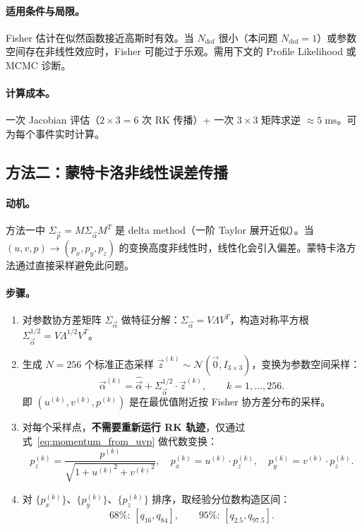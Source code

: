 \documentclass[a4paper, 11pt]{article}
\begin{document}
\paragraph{适用条件与局限。} Fisher 估计在似然函数接近高斯时有效。当 $N_\mathrm{dof}$ 很小（本问题 $N_\mathrm{dof} = 1$）或参数空间存在非线性效应时，Fisher 可能过于乐观。需用下文的 Profile Likelihood 或 MCMC 诊断。

\paragraph{计算成本。} 一次 Jacobian 评估（$2 \times 3 = 6$ 次 RK 传播）+ 一次 $3 \times 3$ 矩阵求逆 $\approx 5\;\mathrm{ms}$。可为每个事件实时计算。

\subsection{方法二：蒙特卡洛非线性误差传播}
\label{sec:mc_prop}

\paragraph{动机。}
方法一中 $\Sigma_{\vec{p}} = M \Sigma_{\vec{\alpha}} M^T$ 是 delta method（一阶 Taylor 展开近似）。当 $(u, v, p) \to (p_x, p_y, p_z)$ 的变换高度非线性时，线性化会引入偏差。蒙特卡洛方法通过直接采样避免此问题。

\paragraph{步骤。}
\begin{enumerate}[nosep]
  \item 对参数协方差矩阵 $\Sigma_{\vec{\alpha}}$ 做特征分解：$\Sigma_{\vec{\alpha}} = V \Lambda V^T$，构造对称平方根 $\Sigma_{\vec{\alpha}}^{1/2} = V \Lambda^{1/2} V^T$。
  \item 生成 $N = 256$ 个标准正态采样 $\vec{z}^{(k)} \sim \mathcal{N}(\vec{0}, I_{3\times3})$，变换为参数空间采样：
  \begin{equation}
    \vec{\alpha}^{(k)} = \hat{\vec{\alpha}} + \Sigma_{\vec{\alpha}}^{1/2} \cdot \vec{z}^{(k)},
    \qquad k = 1, \dots, 256.
  \end{equation}
  即 $(u^{(k)}, v^{(k)}, p^{(k)})$ 是在最优值附近按 Fisher 协方差分布的采样。
  \item 对每个采样点，\textbf{不需要重新运行 RK 轨迹}，仅通过式~\eqref{eq:momentum_from_uvp} 做代数变换：
  \begin{equation}
    p_z^{(k)} = \frac{p^{(k)}}{\sqrt{1 + {u^{(k)}}^2 + {v^{(k)}}^2}}, \quad
    p_x^{(k)} = u^{(k)} \cdot p_z^{(k)}, \quad
    p_y^{(k)} = v^{(k)} \cdot p_z^{(k)}.
  \end{equation}
  \item 对 $\{p_x^{(k)}\}$、$\{p_y^{(k)}\}$、$\{p_z^{(k)}\}$ 排序，取经验分位数构造区间：
  \begin{equation}
    \text{68\%: } [q_{16}, q_{84}], \qquad \text{95\%: } [q_{2.5}, q_{97.5}].
  \end{equation}
\end{enumerate}
\end{document}
